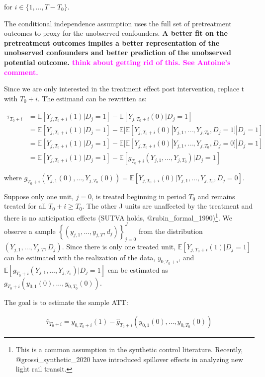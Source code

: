 \documentclass[
]{article}
\begin{document}
for \(i \in \{1,\dots, T-T_0\}\).

The conditional independence assumption uses the full set of
pretreatment outcomes to proxy for the unobserved confounders. \textbf{A
better fit on the pretreatment outcomes implies a better representation
of the unobserved confounders and better prediction of the unobserved
potential outcome.
\textcolor{magenta}{think about getting rid of this. See Antoine's comment.}}

Since we are only interested in the treatment effect post intervention,
replace t with \(T_0+i\). The estimand can be rewritten as:

\[
\begin{aligned}
\tau_{T_0+i}&=\mathbb{E}[Y_{j,T_0+i}(1)|D_j=1]-\mathbb{E}[Y_{j,T_0+i}(0)|D_j=1]\\
&= \mathbb{E}[Y_{j,T_0+i}(1)|D_j=1]-\mathbb{E}[\mathbb{E}[Y_{j,T_0+i}(0)| Y_{j,1},\dots,Y_{j,T_0}, D_j=1 ]|D_j=1]\\
&= \mathbb{E}[Y_{j,T_0+i}(1)|D_j=1]-\mathbb{E}[\mathbb{E}[Y_{j,T_0+i}(0)| Y_{j,1},\dots,Y_{j,T_0}, D_j=0 ]|D_j=1]\\
&=\mathbb{E}[Y_{j,T_0+i}(1)|D_j=1]-\mathbb{E}[g_{T_0+i}\left(Y_{j,1},\dots,Y_{j,T_0}\right)|D_j=1]
\end{aligned}
\]

where
\(g_{T_0+i}\left(Y_{j,1}(0),\dots,Y_{j,T_0}(0)\right)=\mathbb{E}[Y_{j,T_0+i}(0)| Y_{j,1},\dots,Y_{j,T_0}, D_j=0 ]\).

Suppose only one unit, \(j=0\), is treated beginning in period \(T_0\)
and remains treated for all \(T_0+i \ge T_0\). The other J units are
unaffected by the treatment and there is no anticipation effects (SUTVA
holds, @rubin\_formal\_1990)\footnote{This is a common assumption in the
  synthetic control literature. Recently, @grossi\_synthetic\_2020 have
  introduced spillover effects in analyzing new light rail transit.}. We
observe a sample
\(\left\{\left(y_{j,1},\dots,y_{j,T},d_j\right)\right\}_{j=0}^J\) from
the distribution \(\left(Y_{j,1},\dots,Y_{j,T},D_j\right)\). Since there
is only one treated unit, \(\mathbb{E}[Y_{j,T_0+i}(1)|D_j=1]\) can be
estimated with the realization of the data, \(y_{0,T_0+i}\), and
\(\mathbb{E}[g_{T_0+i}\left(Y_{j,1},\dots,Y_{j,T_0}\right)|D_j=1]\) can
be estimated as \(g_{T_0+i}\left(y_{0,1}(0),\dots,y_{0,T_0}(0)\right)\).

The goal is to estimate the sample ATT:

\begin{align}
\hat{\tau}_{T_0+i}=y_{0,T_0+i}(1)-\hat{g}_{T_0+i}\left(y_{0,1}(0),\dots,y_{0,T_0}(0)\right)
\end{align}
\end{document}

